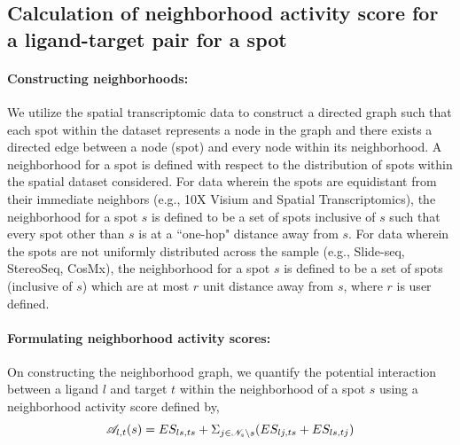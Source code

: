 
\subsection*{Calculation of neighborhood activity score for a ligand-target pair for a spot}

\paragraph{Constructing neighborhoods:} We utilize the spatial transcriptomic data to construct a directed graph such that each spot within the dataset represents a node in the graph and there exists a directed edge between a node (spot) and every node within its neighborhood. A neighborhood for a spot is defined with respect to the distribution of spots within the spatial dataset considered. For data wherein the spots are equidistant from their immediate neighbors (e.g., 10X Visium and Spatial Transcriptomics), the neighborhood for a spot $s$ is defined to be a set of spots inclusive of $s$ such that every spot other than $s$ is at a ``one-hop" distance away from $s$. For data wherein the spots are not uniformly distributed across the sample (e.g., Slide-seq, StereoSeq, CosMx), the neighborhood for a spot $s$ is defined to be a set of spots (inclusive of $s$) which are at most $r$ unit distance away from $s$, where $r$ is user defined.

\paragraph{Formulating neighborhood activity scores:} On constructing the neighborhood graph, we quantify the potential interaction between a ligand $l$ and target $t$ within the neighborhood of a spot $s$ using a neighborhood activity score defined by,
\begin{equation}
    \mathcal{A}_{l,t}(s) = ES_{ls,ts} + \Sigma_{j \in \mathcal{N}_{s} \setminus s} (ES_{lj,ts} + ES_{ls,tj})
\end{equation}

